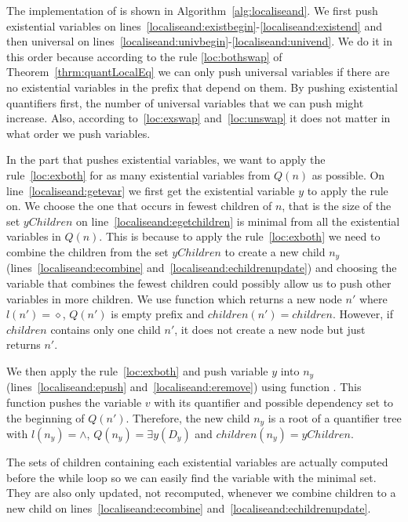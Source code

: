 \documentclass[
  digital, %
  color,
  twoside, %
  table,   %
  nolof,     %
  nolot,     %
]{fithesis3}
\theoremstyle{definition}
\theoremstyle{remark}
\newcommand{\prefix}[1]{Q({#1})}
\newcommand{\children}[1]{children({#1})}
\begin{document}
The implementation of  is shown in Algorithm~\ref{alg:localiseand}. We first push existential variables on lines~\ref{localiseand:existbegin}-\ref{localiseand:existend} and then universal on lines~\ref{localiseand:univbegin}-\ref{localiseand:univend}. We do it in this order because according to the rule \eqref{loc:bothswap} of Theorem~\ref{thrm:quantLocalEq} we can only push universal variables if there are no existential variables in the prefix that depend on them. By pushing existential quantifiers first, the number of universal variables that we can push might increase. Also, according to~\eqref{loc:exswap} and~\eqref{loc:unswap} it does not matter in what order we push variables.

In the part that pushes existential variables, we want to apply the rule~\eqref{loc:exboth} for as many existential variables from $\prefix{n}$ as possible. On line~\ref{localiseand:getevar} we first get the existential variable $y$ to apply the rule on. We choose the one that occurs in fewest children of $n$, that is the size of the set $yChildren$ on line~\ref{localiseand:egetchildren} is minimal from all the existential variables in $\prefix{n}$. This is because to apply the rule~\eqref{loc:exboth} we need to combine the children from the set $yChildren$ to create a new child $n_y$ (lines~\ref{localiseand:ecombine} and~\ref{localiseand:echildrenupdate}) and choosing the variable that combines the fewest children could possibly allow us to push other variables in more children. We use function  which returns a new node $n'$ where $l(n') = {\diamond}$, $\prefix{n'}$ is empty prefix and $\children{n'} = children$. However, if $children$ contains only one child $n'$, it does not create a new node but just returns $n'$. 

We then apply the rule~\eqref{loc:exboth} and push variable $y$ into $n_y$ (lines~\ref{localiseand:epush} and~\ref{localiseand:eremove}) using function . This function pushes the variable $v$ with its quantifier and possible dependency set to the beginning of $\prefix{n'}$. Therefore, the new child $n_y$ is a root of a quantifier tree with $l(n_y) = {\land}$, $\prefix{n_y} = \exists y(D_y)$ and $\children{n_y} = yChildren$.

The sets of children containing each existential variables are actually computed before the while loop so we can easily find the variable with the minimal set. They are also only updated, not recomputed, whenever we combine children to a new child on lines~\ref{localiseand:ecombine} and~\ref{localiseand:echildrenupdate}.
\end{document}
